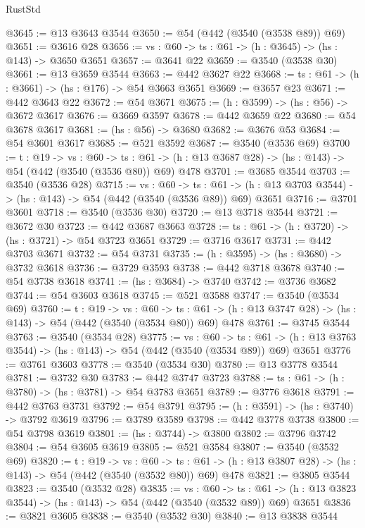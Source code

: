 \begin{lexlean}{RustStd}
\begin{coremodule}
@3645 := @13 @3643 @3544
@3650 := @54 (@442 (@3540 (@3538 @89)) @69)
@3651 := @3616 @28
@3656 := {vs : @60} -> {ts : @61} -> (h : @3645) -> (hs : @143) -> @3650 @3651
@3657 := @3641 @22
@3659 := @3540 (@3538 @30)
@3661 := @13 @3659 @3544
@3663 := @442 @3627 @22
@3668 := {ts : @61} -> (h : @3661) -> (hs : @176) -> @54 @3663 @3651
@3669 := @3657 @23
@3671 := @442 @3643 @22
@3672 := @54 @3671
@3675 := (h : @3599) -> (hs : @56) -> @3672 @3617
@3676 := @3669 @3597
@3678 := @442 @3659 @22
@3680 := @54 @3678 @3617
@3681 := (hs : @56) -> @3680
@3682 := @3676 @53
@3684 := @54 @3601 @3617
@3685 := @521 @3592
@3687 := @3540 (@3536 @69)
@3700 := {t : @19} ->
  {vs : @60} ->
  {ts : @61} -> (h : @13 @3687 @28) -> (hs : @143) -> @54 (@442 (@3540 (@3536 @80)) @69) @478
@3701 := @3685 @3544
@3703 := @3540 (@3536 @28)
@3715 := {vs : @60} ->
  {ts : @61} -> (h : @13 @3703 @3544) -> (hs : @143) -> @54 (@442 (@3540 (@3536 @89)) @69) @3651
@3716 := @3701 @3601
@3718 := @3540 (@3536 @30)
@3720 := @13 @3718 @3544
@3721 := @3672 @30
@3723 := @442 @3687 @3663
@3728 := {ts : @61} -> (h : @3720) -> (hs : @3721) -> @54 @3723 @3651
@3729 := @3716 @3617
@3731 := @442 @3703 @3671
@3732 := @54 @3731
@3735 := (h : @3595) -> (hs : @3680) -> @3732 @3618
@3736 := @3729 @3593
@3738 := @442 @3718 @3678
@3740 := @54 @3738 @3618
@3741 := (hs : @3684) -> @3740
@3742 := @3736 @3682
@3744 := @54 @3603 @3618
@3745 := @521 @3588
@3747 := @3540 (@3534 @69)
@3760 := {t : @19} ->
  {vs : @60} ->
  {ts : @61} -> (h : @13 @3747 @28) -> (hs : @143) -> @54 (@442 (@3540 (@3534 @80)) @69) @478
@3761 := @3745 @3544
@3763 := @3540 (@3534 @28)
@3775 := {vs : @60} ->
  {ts : @61} -> (h : @13 @3763 @3544) -> (hs : @143) -> @54 (@442 (@3540 (@3534 @89)) @69) @3651
@3776 := @3761 @3603
@3778 := @3540 (@3534 @30)
@3780 := @13 @3778 @3544
@3781 := @3732 @30
@3783 := @442 @3747 @3723
@3788 := {ts : @61} -> (h : @3780) -> (hs : @3781) -> @54 @3783 @3651
@3789 := @3776 @3618
@3791 := @442 @3763 @3731
@3792 := @54 @3791
@3795 := (h : @3591) -> (hs : @3740) -> @3792 @3619
@3796 := @3789 @3589
@3798 := @442 @3778 @3738
@3800 := @54 @3798 @3619
@3801 := (hs : @3744) -> @3800
@3802 := @3796 @3742
@3804 := @54 @3605 @3619
@3805 := @521 @3584
@3807 := @3540 (@3532 @69)
@3820 := {t : @19} ->
  {vs : @60} ->
  {ts : @61} -> (h : @13 @3807 @28) -> (hs : @143) -> @54 (@442 (@3540 (@3532 @80)) @69) @478
@3821 := @3805 @3544
@3823 := @3540 (@3532 @28)
@3835 := {vs : @60} ->
  {ts : @61} -> (h : @13 @3823 @3544) -> (hs : @143) -> @54 (@442 (@3540 (@3532 @89)) @69) @3651
@3836 := @3821 @3605
@3838 := @3540 (@3532 @30)
@3840 := @13 @3838 @3544

\end{coremodule}
\end{lexlean}
